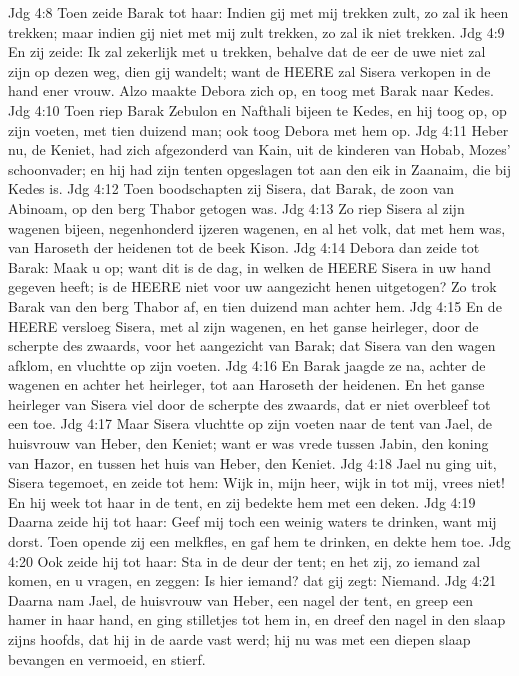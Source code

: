 Jdg 4:8  Toen zeide Barak tot haar: Indien gij met mij trekken zult, zo zal ik heen trekken; maar indien gij niet met mij zult trekken, zo zal ik niet trekken.
Jdg 4:9  En zij zeide: Ik zal zekerlijk met u trekken, behalve dat de eer de uwe niet zal zijn op dezen weg, dien gij wandelt; want de HEERE zal Sisera verkopen in de hand ener vrouw. Alzo maakte Debora zich op, en toog met Barak naar Kedes.
Jdg 4:10  Toen riep Barak Zebulon en Nafthali bijeen te Kedes, en hij toog op, op zijn voeten, met tien duizend man; ook toog Debora met hem op.
Jdg 4:11  Heber nu, de Keniet, had zich afgezonderd van Kain, uit de kinderen van Hobab, Mozes' schoonvader; en hij had zijn tenten opgeslagen tot aan den eik in Zaanaim, die bij Kedes is.
Jdg 4:12  Toen boodschapten zij Sisera, dat Barak, de zoon van Abinoam, op den berg Thabor getogen was.
Jdg 4:13  Zo riep Sisera al zijn wagenen bijeen, negenhonderd ijzeren wagenen, en al het volk, dat met hem was, van Haroseth der heidenen tot de beek Kison.
Jdg 4:14  Debora dan zeide tot Barak: Maak u op; want dit is de dag, in welken de HEERE Sisera in uw hand gegeven heeft; is de HEERE niet voor uw aangezicht henen uitgetogen? Zo trok Barak van den berg Thabor af, en tien duizend man achter hem.
Jdg 4:15  En de HEERE versloeg Sisera, met al zijn wagenen, en het ganse heirleger, door de scherpte des zwaards, voor het aangezicht van Barak; dat Sisera van den wagen afklom, en vluchtte op zijn voeten.
Jdg 4:16  En Barak jaagde ze na, achter de wagenen en achter het heirleger, tot aan Haroseth der heidenen. En het ganse heirleger van Sisera viel door de scherpte des zwaards, dat er niet overbleef tot een toe.
Jdg 4:17  Maar Sisera vluchtte op zijn voeten naar de tent van Jael, de huisvrouw van Heber, den Keniet; want er was vrede tussen Jabin, den koning van Hazor, en tussen het huis van Heber, den Keniet.
Jdg 4:18  Jael nu ging uit, Sisera tegemoet, en zeide tot hem: Wijk in, mijn heer, wijk in tot mij, vrees niet! En hij week tot haar in de tent, en zij bedekte hem met een deken.
Jdg 4:19  Daarna zeide hij tot haar: Geef mij toch een weinig waters te drinken, want mij dorst. Toen opende zij een melkfles, en gaf hem te drinken, en dekte hem toe.
Jdg 4:20  Ook zeide hij tot haar: Sta in de deur der tent; en het zij, zo iemand zal komen, en u vragen, en zeggen: Is hier iemand? dat gij zegt: Niemand.
Jdg 4:21  Daarna nam Jael, de huisvrouw van Heber, een nagel der tent, en greep een hamer in haar hand, en ging stilletjes tot hem in, en dreef den nagel in den slaap zijns hoofds, dat hij in de aarde vast werd; hij nu was met een diepen slaap bevangen en vermoeid, en stierf.
